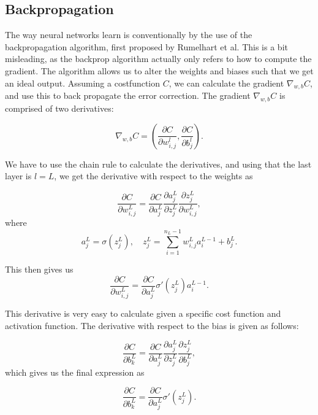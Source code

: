 \subsection*{Backpropagation}
The way neural networks learn is conventionally by the use of the backpropagation algorithm, first proposed by Rumelhart et al\cite{backprop}. This is a bit misleading, 
as the backprop algorithm actually only refers to how to compute the gradient\cite{Goodfellow-et-al-2016}. The algorithm allows us to alter the weights and biases such that
we get an ideal output. Assuming a costfunction $C$, we can calculate the gradient $\nabla_{w, b}C$, and use this to back propagate the error correction. The gradient $\nabla_{w, b}C$ is comprised of 
two derivatives:

\begin{equation*}
    \nabla_{w, b}C = \left(\frac{\partial C}{\partial w_{i,j}^l}, \frac{\partial C}{\partial b_j^l}\right).
\end{equation*}

We have to use the chain rule to calculate the derivatives, and using that the last layer is $l=L$, we get the derivative with respect to the weights as 

\begin{equation*}
    \frac{\partial C}{\partial w_{i,j}^L} = \frac{\partial C}{\partial a_j^L}\frac{\partial a_j^L}{\partial z_j^L}\frac{\partial z_j^L}{\partial w_{i,j}^L},
\end{equation*}
where 
\begin{equation*}
    a_j^L = \sigma(z_j^L), \quad z_j^L = \sum_{i=1}^{n_L-1} w_{i,j}^La_i^{L-1} + b_j^L.
\end{equation*}

This then gives us 
\begin{equation*}
    \frac{\partial C}{\partial w_{i,j}^L} = \frac{\partial C}{\partial a_j^L}\sigma'(z_j^L)a_i^{L-1}.
\end{equation*}

This derivative is very easy to calculate given a specific cost function and activation function. The derivative with respect to the bias is given as follows:

\begin{equation*}
    \frac{\partial C}{\partial b_k^L} = \frac{\partial C}{\partial a_j^L}\frac{\partial a_j^L}{\partial z_j^L}\frac{\partial z_j^L}{\partial b_{j}^L},
\end{equation*}
which gives us the final expression as 

\begin{equation*}
    \frac{\partial C}{\partial b_k^L} = \frac{\partial C}{\partial a_j^L}\sigma'(z_j^L). 
\end{equation*}

